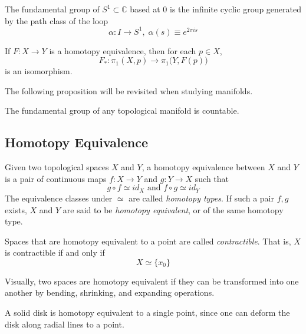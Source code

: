   \begin{example}
  The fundamental group of $S^1 \subset \mathbb{C}$ based at $0$ is the infinite cyclic group generated by the path class of the loop
  \[\alpha: I \longrightarrow S^1, \; \alpha(s) \equiv e^{2 \pi i s}\]
  \end{example}

  \begin{theorem}
  If $F: X \longrightarrow Y$ is a homotopy equivalence, then for each $p \in X$, 
  \[F_* : \pi_1 (X, p) \longrightarrow \pi_1 \big( Y, F(p) \big)\]
  is an isomorphism. 
  \end{theorem}

  The following proposition will be revisited when studying manifolds. 

  \begin{proposition}
  The fundamental group of any topological manifold is countable. 
  \end{proposition}

\subsection{Homotopy Equivalence}

  \begin{definition}
  Given two topological spaces $X$ and $Y$, a homotopy equivalence between $X$ and $Y$ is a pair of continuous maps $f:X \longrightarrow Y$ and $g: Y \longrightarrow X$ such that 
  \[g \circ f \simeq id_X \text{ and } f \circ g \simeq id_Y\]
  The equivalence classes under $\simeq$ are called \textit{homotopy types}. If such a pair $f, g$ exists, $X$ and $Y$ are said to be \textit{homotopy equivalent}, or of the same homotopy type. 
  \end{definition}

  \begin{definition}
  Spaces that are homotopy equivalent to a point are called \textit{contractible}. That is, $X$ is contractible if and only if 
  \[X \simeq \{x_0\}\]
  \end{definition}

  Visually, two spaces are homotopy equivalent if they can be transformed into one another by bending, shrinking, and expanding operations. 

  \begin{example}
  A solid disk is homotopy equivalent to a single point, since one can deform the disk along radial lines to a point. 
  \end{example}

